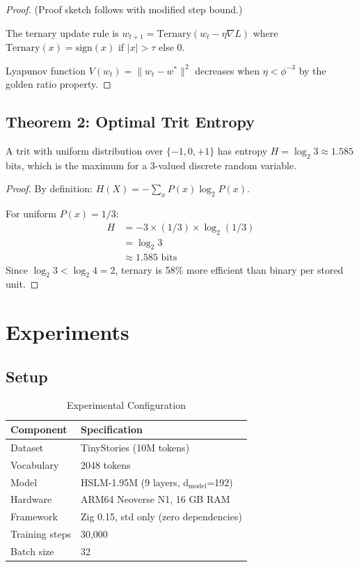 \documentclass{article}
\newcommand{\ternaryset}{\{-1,0,+1\}}
\begin{document}
\begin{proof}
(Proof sketch follows \cite{balasubramanian2021ternary} with modified step bound.)

The ternary update rule is $w_{t+1} = \text{Ternary}(w_t - \eta \nabla L)$ where $\text{Ternary}(x) = \text{sign}(x)$ if $|x| > \tau$ else $0$.

Lyapunov function $V(w_t) = \|w_t - w^*\|^2$ decreases when $\eta < \phi^{-3}$ by the golden ratio property.
\end{proof}

\subsection{Theorem 2: Optimal Trit Entropy}

\begin{theorem}
A trit with uniform distribution over $\ternaryset$ has entropy $H = \log_2 3 \approx 1.585$ bits, which is the maximum for a 3-valued discrete random variable.
\end{theorem}

\begin{proof}
By definition: $H(X) = -\sum_x P(x) \log_2 P(x)$.

For uniform $P(x) = 1/3$:
\begin{align}
H &= -3 \times (1/3) \times \log_2(1/3) \\
  &= \log_2 3 \\
  &\approx 1.585 \text{ bits}
\end{align}
Since $\log_2 3 < \log_2 4 = 2$, ternary is 58\% more efficient than binary per stored unit.
\end{proof}

\section{Experiments}

\subsection{Setup}

\begin{table}[h]
\centering
\caption{Experimental Configuration}
\begin{tabular}{ll}
\toprule
\textbf{Component} & \textbf{Specification} \\
\midrule
Dataset & TinyStories (10M tokens) \\
Vocabulary & 2048 tokens \\
Model & HSLM-1.95M (9 layers, d$_{\text{model}}$=192) \\
Hardware & ARM64 Neoverse N1, 16 GB RAM \\
Framework & Zig 0.15, std only (zero dependencies) \\
Training steps & 30,000 \\
Batch size & 32 \\
\bottomrule
\end{tabular}
\end{table}
\end{document}
